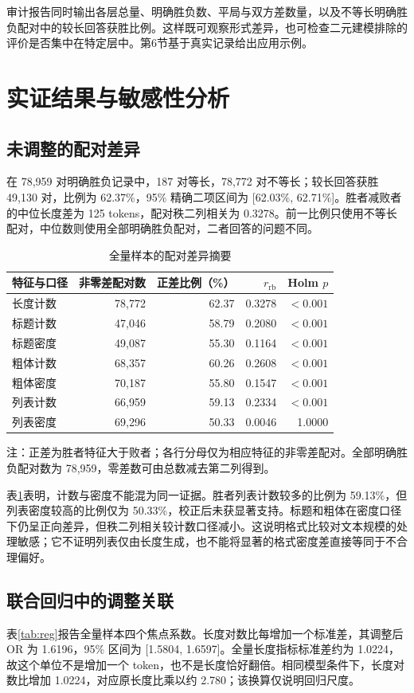 \documentclass[UTF8,11pt,a4paper,fontset=windows]{ctexart}
\numberwithin{equation}{section}
\begin{document}
审计报告同时输出各层总量、明确胜负数、平局与双方差数量，以及不等长明确胜负配对中的较长回答获胜比例。这样既可观察形式差异，也可检查二元建模排除的评价是否集中在特定层中。第6节基于真实记录给出应用示例。

\section{实证结果与敏感性分析}
\subsection{未调整的配对差异}
在 78,959 对明确胜负记录中，187 对等长，78,772 对不等长；较长回答获胜 49,130 对，比例为 62.37\%，95\% 精确二项区间为 [62.03\%, 62.71\%]。胜者减败者的中位长度差为 125 tokens，配对秩二列相关为 0.3278。前一比例只使用不等长配对，中位数则使用全部明确胜负配对，二者回答的问题不同。

\begin{table}[htbp]\centering\small
\caption{全量样本的配对差异摘要}\label{tab:paired}
\begin{tabular}{lrrrr}
\toprule
特征与口径 & 非零差配对数 & 正差比例（\%） & $r_{\mathrm{rb}}$ & Holm $p$\\
\midrule
长度计数 & 78,772 & 62.37 & 0.3278 & $<0.001$\\
标题计数 & 47,046 & 58.79 & 0.2080 & $<0.001$\\
标题密度 & 49,087 & 55.30 & 0.1164 & $<0.001$\\
粗体计数 & 68,357 & 60.26 & 0.2608 & $<0.001$\\
粗体密度 & 70,187 & 55.80 & 0.1547 & $<0.001$\\
列表计数 & 66,959 & 59.13 & 0.2334 & $<0.001$\\
列表密度 & 69,296 & 50.33 & 0.0046 & 1.0000\\
\bottomrule
\end{tabular}
\par\smallskip\footnotesize 注：正差为胜者特征大于败者；各行分母仅为相应特征的非零差配对。全部明确胜负配对数为 78,959，零差数可由总数减去第二列得到。
\end{table}

表\ref{tab:paired}表明，计数与密度不能混为同一证据。胜者列表计数较多的比例为 59.13\%，但列表密度较高的比例仅为 50.33\%，校正后未获显著支持。标题和粗体在密度口径下仍呈正向差异，但秩二列相关较计数口径减小。这说明格式比较对文本规模的处理敏感；它不证明列表仅由长度生成，也不能将显著的格式密度差直接等同于不合理偏好。

\subsection{联合回归中的调整关联}
表\ref{tab:reg}报告全量样本四个焦点系数。长度对数比每增加一个标准差，其调整后 OR 为 1.6196，95\% 区间为 [1.5804, 1.6597]。全量长度指标标准差约为 1.0224，故这个单位不是增加一个 token，也不是长度恰好翻倍。相同模型条件下，长度对数比增加 1.0224，对应原长度比乘以约 2.780；该换算仅说明回归尺度。
\end{document}
